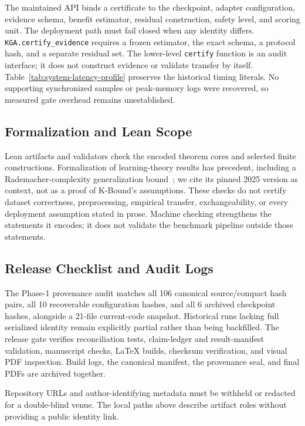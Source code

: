 The maintained API binds a certificate to the checkpoint, adapter configuration, evidence schema,
benefit estimator, residual construction, safety level, and scoring unit. The deployment path must
fail closed when any identity differs. \texttt{KGA.certify\_evidence} requires a frozen estimator,
the exact schema, a protocol hash, and a separate residual set. The lower-level
\texttt{certify} function is an audit interface; it does not construct evidence or validate
transfer by itself. Table~\ref{tab:system-latency-profile} preserves the historical timing literals. No supporting synchronized samples or peak-memory logs were recovered, so measured gate overhead remains unestablished.

\begin{table}[t]
\centering
\small
\caption{Unverified historical runtime literals, retained for auditability. The claimed MPS/batch-16/100-pass measurement has no recovered timing or peak-memory log. Neither 0.62 ms gate overhead nor its 5.0\% ratio is an authenticated performance result.}
\label{tab:system-latency-profile}
\resizebox{\textwidth}{!}{}
\end{table}

\subsection{Formalization and Lean Scope}

Lean artifacts and validators check the encoded theorem cores and selected finite constructions.
Formalization of learning-theory results has precedent, including a Rademacher-complexity
generalization bound~\cite{sonoda2025lean}; we cite its pinned 2025 version as context, not as a
proof of K-Bound's assumptions.
These checks do not certify dataset correctness, preprocessing, empirical transfer, exchangeability, or
every deployment assumption stated in prose. Machine checking strengthens the statements it
encodes; it does not validate the benchmark pipeline outside those statements.

\subsection{Release Checklist and Audit Logs}

The Phase-1 provenance audit matches all 106 canonical source/compact hash pairs, all 10 recoverable
configuration hashes, and all 6 archived checkpoint hashes, alongside a 21-file current-code
snapshot. Historical runs lacking full serialized identity remain explicitly partial rather
than being backfilled. The release gate verifies reconciliation tests, claim-ledger and result-manifest
validation, manuscript checks, LaTeX builds, checksum verification, and visual PDF inspection. Build
logs, the canonical manifest, the provenance seal, and final PDFs are archived together.

\ifanon
Repository URLs and author-identifying metadata must be withheld or redacted for a double-blind
venue. The local paths above describe artifact roles without providing a public identity link.
\fi
